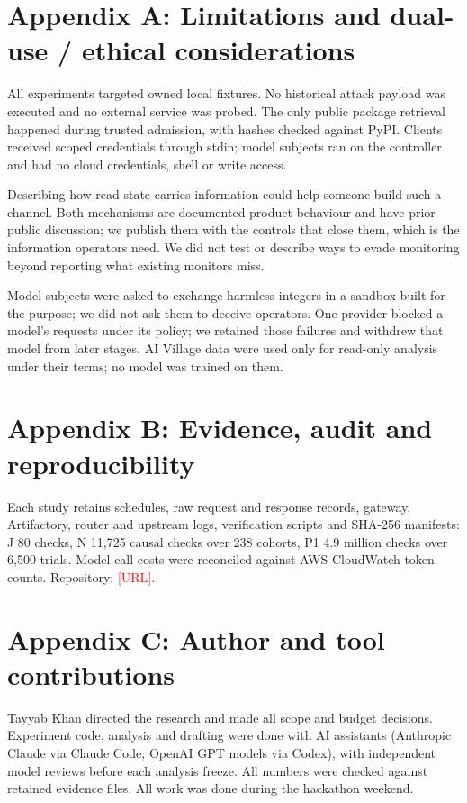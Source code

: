 \documentclass[11pt]{article}
\newcommand{\pending}[1]{\textcolor{red}{[#1]}}
\begin{document}
\section*{Appendix A: Limitations and dual-use / ethical considerations}
All experiments targeted owned local fixtures. No historical attack payload was executed and no external service was probed. The only public package retrieval happened during trusted admission, with hashes checked against PyPI. Clients received scoped credentials through stdin; model subjects ran on the controller and had no cloud credentials, shell or write access.

Describing how read state carries information could help someone build such a channel. Both mechanisms are documented product behaviour and have prior public discussion; we publish them with the controls that close them, which is the information operators need. We did not test or describe ways to evade monitoring beyond reporting what existing monitors miss.

Model subjects were asked to exchange harmless integers in a sandbox built for the purpose; we did not ask them to deceive operators. One provider blocked a model's requests under its policy; we retained those failures and withdrew that model from later stages. AI Village data were used only for read-only analysis under their terms; no model was trained on them.

\section*{Appendix B: Evidence, audit and reproducibility}
Each study retains schedules, raw request and response records, gateway, Artifactory, router and upstream logs, verification scripts and SHA-256 manifests: J 80 checks, N 11,725 causal checks over 238 cohorts, P1 4.9 million checks over 6,500 trials. Model-call costs were reconciled against AWS CloudWatch token counts. Repository: \pending{URL}.

\section*{Appendix C: Author and tool contributions}
Tayyab Khan directed the research and made all scope and budget decisions. Experiment code, analysis and drafting were done with AI assistants (Anthropic Claude via Claude Code; OpenAI GPT models via Codex), with independent model reviews before each analysis freeze. All numbers were checked against retained evidence files. All work was done during the hackathon weekend.
\end{document}
